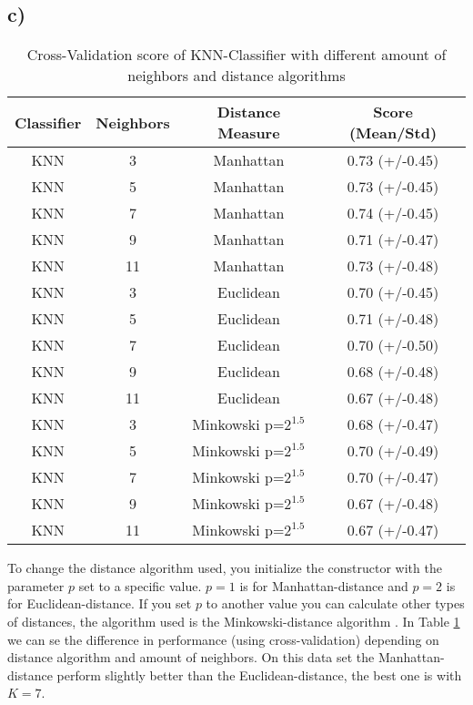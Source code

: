 \documentclass{article}
\begin{document}
      \subsection{c)}
        \label{ssc:1c}
        \begin{table}[h]
          \centering
          \label{tbl:task1c}
          \begin{tabular}{cccc}
            \toprule
            Classifier &  Neighbors & Distance Measure &           Score (Mean/Std)\\
            \midrule
            KNN &          3 &              Manhattan &  0.73 (+/-0.45) \\
            KNN &          5 &              Manhattan &  0.73 (+/-0.45) \\
            KNN &          7 &              Manhattan &  0.74 (+/-0.45) \\
            KNN &          9 &              Manhattan &  0.71 (+/-0.47) \\
            KNN &         11 &              Manhattan &  0.73 (+/-0.48) \\
            KNN &          3 &              Euclidean &  0.70 (+/-0.45) \\
            KNN &          5 &              Euclidean &  0.71 (+/-0.48) \\
            KNN &          7 &              Euclidean &  0.70 (+/-0.50) \\
            KNN &          9 &              Euclidean &  0.68 (+/-0.48) \\
            KNN &         11 &              Euclidean &  0.67 (+/-0.48) \\
            KNN &          3 &  Minkowski p=$2^{1.5}$ &  0.68 (+/-0.47) \\
            KNN &          5 &  Minkowski p=$2^{1.5}$ &  0.70 (+/-0.49) \\
            KNN &          7 &  Minkowski p=$2^{1.5}$ &  0.70 (+/-0.47) \\
            KNN &          9 &  Minkowski p=$2^{1.5}$ &  0.67 (+/-0.48) \\
            KNN &         11 &  Minkowski p=$2^{1.5}$ &  0.67 (+/-0.47) \\
            \bottomrule
          \end{tabular}
          \caption{Cross-Validation score of KNN-Classifier with different amount of neighbors and distance algorithms}
        \end{table}
        To change the distance algorithm used, you initialize the constructor with the parameter $p$ set to a 
        specific value. $p=1$ is for Manhattan-distance and $p=2$ is for Euclidean-distance.
        If you set $p$ to another value you can calculate other types of distances, the algorithm used 
        is the Minkowski-distance algorithm \cite{Minkowski}.
        In Table \ref{tbl:task1c} we can se the difference in performance (using cross-validation) depending on distance algorithm 
        and amount of neighbors. On this data set the Manhattan-distance perform slightly 
        better than the Euclidean-distance, the best one is with $K=7$.
\end{document}
